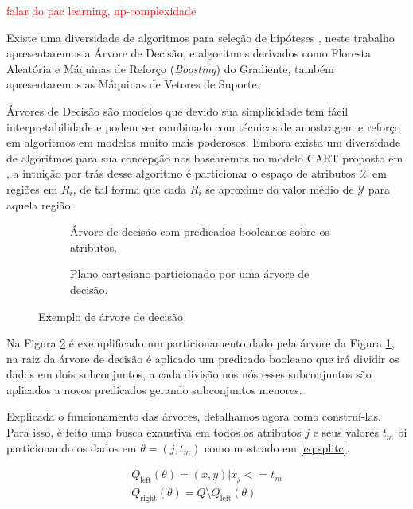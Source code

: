 \textcolor{red}{falar do pac learning, np-complexidade}

Existe uma diversidade de algoritmos para seleção de hipóteses
\cite{bishop2006pattern,friedman2001elements}, neste trabalho apresentaremos a
Árvore de Decisão, e algoritmos derivados como Floresta Aleatória e Máquinas de
Reforço (\textit{Boosting}) do Gradiente, também apresentaremos as Máquinas de
Vetores de Suporte.

Árvores de Decisão são modelos que devido sua simplicidade tem fácil
interpretabilidade e podem ser combinado com técnicas de amostragem e reforço
em algoritmos em modelos muito mais poderosos. Embora exista um diversidade de
algoritmos para sua concepção nos basearemos no modelo CART proposto em
\cite{breiman1984classification}, a intuição por trás desse algoritmo é
particionar o espaço de atributos $\mathcal{X}$ em regiões em $R_i$, de
tal forma que cada $R_i$ se aproxime do valor médio de $\mathcal{Y}$ para
aquela região.

\begin{figure}[ht]
   \centering
    \begin{subfigure}{.4\textwidth}
        \centering
        \def\svgwidth{1.4\linewidth}
        \caption{Árvore de decisão com predicados booleanos sobre os atributos.}
        \label{fig:tree}
    \end{subfigure}
     \hfill
    \begin{subfigure}{.4\textwidth}
        \centering
        \def\svgwidth{.8\linewidth}
        \caption{Plano cartesiano particionado por uma árvore de decisão.}
        \label{fig:split}
    \end{subfigure}
    \caption{Exemplo de árvore de decisão}
    \label{fig:three graphs}
\end{figure}


Na Figura \ref{fig:split} é exemplificado um particionamento dado pela árvore
da Figura \ref{fig:tree}, na raiz da árvore de decisão é aplicado um predicado
booleano que irá dividir os dados em dois subconjuntos, a cada divisão nos nós
esses subconjuntos são aplicados a novos predicados gerando subconjuntos
menores.

Explicada o funcionamento das árvores, detalhamos agora como construí-las. Para
isso, é feito uma busca exaustiva em todos os atributos $j$ e seus valores
$t_m$ bi particionando os dados em $\theta = (j,t_m)$ como mostrado em
\ref{eq:splitc}.

\begin{equation}
        \begin{aligned}
            Q_{\text{left}}(\theta) = {(x, y) | x_j <= t_m}\\
            Q_{\text{right}}(\theta) = Q \setminus Q_{\text{left}}(\theta)
        \end{aligned}
    \label{eq:splitc}
\end{equation}

